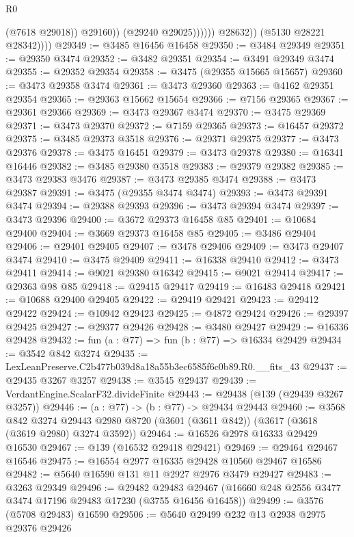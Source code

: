 \begin{lexlean}{R0}
\begin{coremodule}
                              (@7618 @29018))
                            @29160))
                        (@29240 @29025))))))
              @28632))
          (@5130 @28221 @28342))))
@29349 := @3485 @16456 @16458
@29350 := @3484 @29349
@29351 := @29350 @3474
@29352 := @3482 @29351
@29354 := @3491 @29349 @3474
@29355 := @29352 @29354
@29358 := @3475 (@29355 @15665 @15657)
@29360 := @3473 @29358 @3474
@29361 := @3473 @29360
@29363 := @4162 @29351 @29354
@29365 := @29363 @15662 @15654
@29366 := @7156 @29365
@29367 := @29361 @29366
@29369 := @3473 @29367 @3474
@29370 := @3475 @29369
@29371 := @3473 @29370
@29372 := @7159 @29365
@29373 := @16457 @29372
@29375 := @3485 @29373 @3518
@29376 := @29371 @29375
@29377 := @3473 @29376
@29378 := @3475 @16451
@29379 := @3473 @29378
@29380 := @16341 @16446
@29382 := @3485 @29380 @3518
@29383 := @29379 @29382
@29385 := @3473 @29383 @3476
@29387 := @3473 @29385 @3474
@29388 := @3473 @29387
@29391 := @3475 (@29355 @3474 @3474)
@29393 := @3473 @29391 @3474
@29394 := @29388 @29393
@29396 := @3473 @29394 @3474
@29397 := @3473 @29396
@29400 := @3672 @29373 @16458 @85
@29401 := @10684 @29400
@29404 := @3669 @29373 @16458 @85
@29405 := @3486 @29404
@29406 := @29401 @29405
@29407 := @3478 @29406
@29409 := @3473 @29407 @3474
@29410 := @3475 @29409
@29411 := @16338 @29410
@29412 := @3473 @29411
@29414 := @9021 @29380 @16342
@29415 := @9021 @29414
@29417 := @29363 @98 @85
@29418 := @29415 @29417
@29419 := @16483 @29418
@29421 := @10688 @29400 @29405
@29422 := @29419 @29421
@29423 := @29412 @29422
@29424 := @10942 @29423
@29425 := @4872 @29424
@29426 := @29397 @29425
@29427 := @29377 @29426
@29428 := @3480 @29427
@29429 := @16336 @29428
@29432 := fun (a : @77) => fun (b : @77) => @16334 @29429
@29434 := @3542 @842 @3274
@29435 := LexLeanPreserve.C2b477b039d8a18a55b3ec6585f6c0b89.R0.__fits_43
@29437 := @29435 @3267 @3257
@29438 := @3545 @29437
@29439 := VerdantEngine.ScalarF32.divideFinite
@29443 := @29438 (@139 (@29439 @3267 @3257))
@29446 := (a : @77) -> (b : @77) -> @29434 @29443
@29460 := @3568
    @842
    @3274
    @29443
    @2980
    @8720
    (@3601 (@3611 @842))
    (@3617 (@3618 (@3619 @2980) @3274 @3592))
@29464 := @16526 @2978 @16333 @29429 @16530
@29467 := @139 (@16532 @29418 @29421)
@29469 := @29464 @29467 @16546
@29475 := @16554 @2977 @16335 @29428 @10560 @29467 @16586
@29482 := @5640 @16590 @131 @11 @2927 @2976 @3479 @29427
@29483 := @3263 @29349
@29496 := @29482
    @29483
    @29467
    (@16660 @248 @2556 @3477 @3474 @17196 @29483 @17230 (@3755 @16456 @16458))
@29499 := @3576 (@5708 @29483) @16590
@29506 := @5640 @29499 @232 @13 @2938 @2975 @29376 @29426

\end{coremodule}
\end{lexlean}

